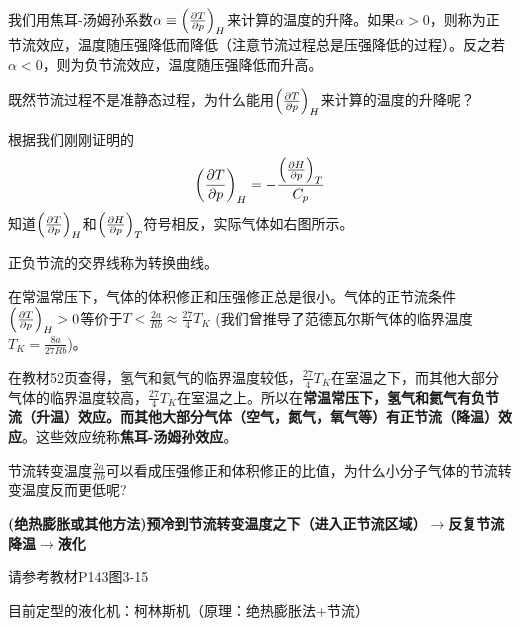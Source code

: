 \documentclass[CJK]{beamer}
\begin{document}
\begin{frame}
\bch
我们用焦耳-汤姆孙系数$\alpha \equiv \left(\frac{\partial T}{\partial p}\right)_{H}$来计算的温度的升降。如果$\alpha>0$，则称为正节流效应，温度随压强降低而降低（注意节流过程总是压强降低的过程）。反之若$\alpha<0$，则为负节流效应，温度随压强降低而升高。

\ech
\end{frame}

\begin{frame}
\bch
{}

既然节流过程不是准静态过程，为什么能用$\left(\frac{\partial T}{\partial p}\right)_{H}$来计算的温度的升降呢？
\ech
\end{frame}

\begin{frame}
\bch

{
\small

根据我们刚刚证明的
$$\left(\frac{\partial T}{\partial p}\right)_{H} = - \frac{\left(\frac{\partial H}{\partial p}\right)_{T}}{C_p}$$
知道$\left(\frac{\partial T}{\partial p}\right)_{H}$和$\left(\frac{\partial H}{\partial p}\right)_{T}$符号相反，实际气体如右图所示。

\skipline

正负节流的交界线称为转换曲线。

}
\emini
{}
\emini
\ech
\end{frame}


\begin{frame}
\bch

在常温常压下，气体的体积修正和压强修正总是很小。气体的正节流条件$\left(\frac{\partial T}{\partial p}\right)_{H}>0$等价于$T<\frac{2a}{Rb} \approx \frac{27}{4} T_K$ (我们曾推导了范德瓦尔斯气体的临界温度$T_K = \frac{8a}{27Rb}$)。

\skipline

在教材52页查得，氢气和氦气的临界温度较低，$\frac{27}{4} T_K$在室温之下，而其他大部分气体的临界温度较高，$\frac{27}{4} T_K$在室温之上。所以在{\bf 常温常压下，氢气和氦气有负节流（升温）效应。而其他大部分气体（空气，氮气，氧气等）有正节流（降温）效应}。这些效应统称{\bf 焦耳-汤姆孙效应}。
\ech
\end{frame}

\begin{frame}
\bch
{}

节流转变温度$\frac{2a}{Rb}$可以看成压强修正和体积修正的比值，为什么小分子气体的节流转变温度反而更低呢?

\ech
\end{frame}

\begin{frame}
\bch
{\bf (绝热膨胀或其他方法)预冷到节流转变温度之下（进入正节流区域）$\rightarrow$反复节流降温$\rightarrow$液化}

\skiplines

请参考教材P143图3-15 

\skiplines

目前定型的液化机：柯林斯机（原理：绝热膨胀法+节流）
\ech
\end{frame}
\end{document}
